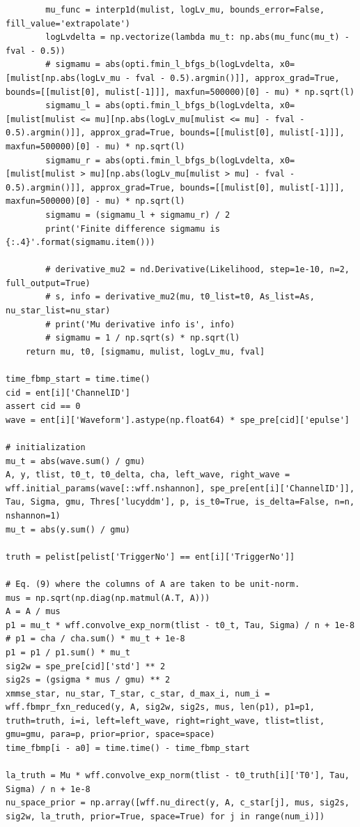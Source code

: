 \documentclass[notitlepage]{article}
\begin{document}
\begin{lstlisting}
        mu_func = interp1d(mulist, logLv_mu, bounds_error=False, fill_value='extrapolate')
        logLvdelta = np.vectorize(lambda mu_t: np.abs(mu_func(mu_t) - fval - 0.5))
        # sigmamu = abs(opti.fmin_l_bfgs_b(logLvdelta, x0=[mulist[np.abs(logLv_mu - fval - 0.5).argmin()]], approx_grad=True, bounds=[[mulist[0], mulist[-1]]], maxfun=500000)[0] - mu) * np.sqrt(l)
        sigmamu_l = abs(opti.fmin_l_bfgs_b(logLvdelta, x0=[mulist[mulist <= mu][np.abs(logLv_mu[mulist <= mu] - fval - 0.5).argmin()]], approx_grad=True, bounds=[[mulist[0], mulist[-1]]], maxfun=500000)[0] - mu) * np.sqrt(l)
        sigmamu_r = abs(opti.fmin_l_bfgs_b(logLvdelta, x0=[mulist[mulist > mu][np.abs(logLv_mu[mulist > mu] - fval - 0.5).argmin()]], approx_grad=True, bounds=[[mulist[0], mulist[-1]]], maxfun=500000)[0] - mu) * np.sqrt(l)
        sigmamu = (sigmamu_l + sigmamu_r) / 2
        print('Finite difference sigmamu is {:.4}'.format(sigmamu.item()))

        # derivative_mu2 = nd.Derivative(Likelihood, step=1e-10, n=2, full_output=True)
        # s, info = derivative_mu2(mu, t0_list=t0, As_list=As, nu_star_list=nu_star)
        # print('Mu derivative info is', info)
        # sigmamu = 1 / np.sqrt(s) * np.sqrt(l)
    return mu, t0, [sigmamu, mulist, logLv_mu, fval]

time_fbmp_start = time.time()
cid = ent[i]['ChannelID']
assert cid == 0
wave = ent[i]['Waveform'].astype(np.float64) * spe_pre[cid]['epulse']

# initialization
mu_t = abs(wave.sum() / gmu)
A, y, tlist, t0_t, t0_delta, cha, left_wave, right_wave = wff.initial_params(wave[::wff.nshannon], spe_pre[ent[i]['ChannelID']], Tau, Sigma, gmu, Thres['lucyddm'], p, is_t0=True, is_delta=False, n=n, nshannon=1)
mu_t = abs(y.sum() / gmu)

truth = pelist[pelist['TriggerNo'] == ent[i]['TriggerNo']]

# Eq. (9) where the columns of A are taken to be unit-norm.
mus = np.sqrt(np.diag(np.matmul(A.T, A)))
A = A / mus
p1 = mu_t * wff.convolve_exp_norm(tlist - t0_t, Tau, Sigma) / n + 1e-8
# p1 = cha / cha.sum() * mu_t + 1e-8
p1 = p1 / p1.sum() * mu_t
sig2w = spe_pre[cid]['std'] ** 2
sig2s = (gsigma * mus / gmu) ** 2
xmmse_star, nu_star, T_star, c_star, d_max_i, num_i = wff.fbmpr_fxn_reduced(y, A, sig2w, sig2s, mus, len(p1), p1=p1, truth=truth, i=i, left=left_wave, right=right_wave, tlist=tlist, gmu=gmu, para=p, prior=prior, space=space)
time_fbmp[i - a0] = time.time() - time_fbmp_start

la_truth = Mu * wff.convolve_exp_norm(tlist - t0_truth[i]['T0'], Tau, Sigma) / n + 1e-8
nu_space_prior = np.array([wff.nu_direct(y, A, c_star[j], mus, sig2s, sig2w, la_truth, prior=True, space=True) for j in range(num_i)])


\end{lstlisting}
\end{document}
